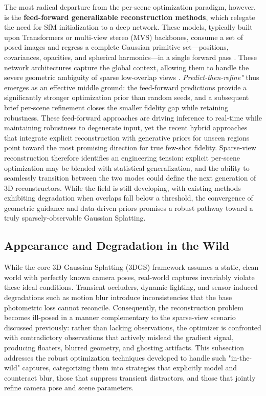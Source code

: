\documentclass[11pt,a4paper]{article}
\begin{document}
The most radical departure from the per-scene optimization paradigm, however, is the \textbf{feed-forward generalizable reconstruction methods}, which relegate the need for SfM initialization to a deep network. These models, typically built upon Transformers or multi-view stereo (MVS) backbones, consume a set of posed images and regress a complete Gaussian primitive set---positions, covariances, opacities, and spherical harmonics---in a single forward pass \cite{arxiv:2412.04826v1}. These network architectures capture the global context, allowing them to handle the severe geometric ambiguity of sparse low-overlap views \cite{arxiv:2404.06270v2}. \emph{Predict-then-refine"} thus emerges as an effective middle ground: the feed-forward predictions provide a significantly stronger optimization prior than random seeds, and a subsequent brief per-scene refinement closes the smaller fidelity gap while retaining robustness. These feed-forward approaches are driving inference to real-time while maintaining robustness to degenerate input, yet the recent hybrid approaches that integrate explicit reconstruction with generative priors for unseen regions point toward the most promising direction for true few-shot fidelity. Sparse-view reconstruction therefore identifies an engineering tension: explicit per-scene optimization may be blended with statistical generalization, and the ability to seamlessly transition between the two modes could define the next generation of 3D reconstructors. While the field is still developing, with existing methods exhibiting degradation when overlaps fall below a threshold, the convergence of geometric guidance and data-driven priors promises a robust pathway toward a truly sparsely-observable Gaussian Splatting.


\subsection{Appearance and Degradation in the Wild}


While the core 3D Gaussian Splatting (3DGS) framework assumes a static, clean world with perfectly known camera poses, real-world captures invariably violate these ideal conditions. Transient occluders, dynamic lighting, and sensor-induced degradations such as motion blur introduce inconsistencies that the base photometric loss cannot reconcile. Consequently, the reconstruction problem becomes ill-posed in a manner complementary to the sparse-view scenario discussed previously: rather than lacking observations, the optimizer is confronted with contradictory observations that actively mislead the gradient signal, producing floaters, blurred geometry, and ghosting artifacts. This subsection addresses the robust optimization techniques developed to handle such "in-the-wild" captures, categorizing them into strategies that explicitly model and counteract blur, those that suppress transient distractors, and those that jointly refine camera pose and scene parameters.
\end{document}
